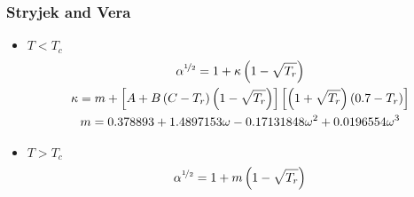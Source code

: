 \subsubsection{Stryjek and Vera\cite{stryjekVera}}

\begin{itemize}
\item{$T < T_c$}
\begin{gather}
\alpha^{\nicefrac{1}{2}} = 1 + \kappa\left(1-\sqrt{T_r}\right)\\
\kappa = m + \left[
		A+ B\left(C- T_r\right)\left(1-\sqrt{T_r}\right)
	\right]
	\left[
		\left(1+ \sqrt{T_r}\right)\left(0.7-T_r\right)
	\right]\\
m=0.378893 + 1.4897153 \omega - 0.17131848 \omega^2+ 0.0196554 \omega^3
\end{gather}
\item{$T > T_c$}
\begin{equation}
\alpha^{\nicefrac{1}{2}} = 1 + m\left(1-\sqrt{T_r}\right)
\end{equation}
\end{itemize}
